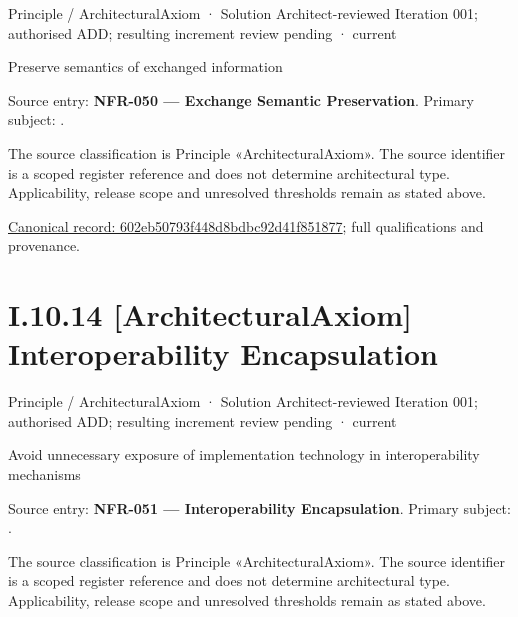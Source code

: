 \label{element:602eb50793f448d8bdbc92d41f851877}
{\small Principle / ArchitecturalAxiom · Solution Architect-reviewed Iteration 001; authorised ADD; resulting increment review pending · current}\par

Preserve semantics of exchanged information



Source entry: \textbf{NFR-050 — Exchange Semantic Preservation}. Primary subject: \texttt{}.



The source classification is Principle «ArchitecturalAxiom». The source identifier is a scoped register reference and does not determine architectural type. Applicability, release scope and unresolved thresholds remain as stated above.


{\footnotesize \href{../../../../continuum/motivation/principle/architectural-axiom/602eb50793f448d8bdbc92d41f851877.md}{Canonical record: 602eb50793f448d8bdbc92d41f851877}; full qualifications and provenance.}\par
\section*{I.10.14 [ArchitecturalAxiom] Interoperability Encapsulation}
\label{navigation:I.10.14}

\label{element:e9e0b4f82b6544e7ba87651c578d82c2}
{\small Principle / ArchitecturalAxiom · Solution Architect-reviewed Iteration 001; authorised ADD; resulting increment review pending · current}\par

Avoid unnecessary exposure of implementation technology in interoperability mechanisms



Source entry: \textbf{NFR-051 — Interoperability Encapsulation}. Primary subject: \texttt{}.



The source classification is Principle «ArchitecturalAxiom». The source identifier is a scoped register reference and does not determine architectural type. Applicability, release scope and unresolved thresholds remain as stated above.


